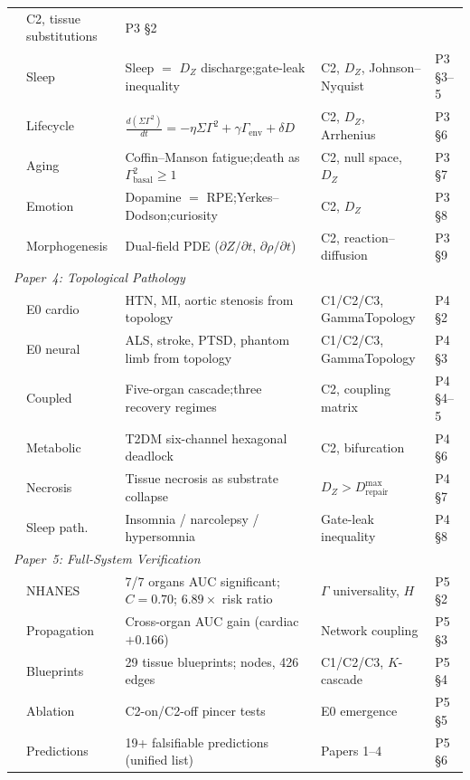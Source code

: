 \documentclass[aps,pre,twocolumn,superscriptaddress,floatfix]{revtex4-2}
\begin{document}
\begin{table}[t]
\begin{ruledtabular}
\begin{tabular}{lllll}
  & C2, tissue substitutions
  & P3 \S2 \\
& Sleep &
  Sleep $=$ $D_Z$ discharge;\;gate-leak inequality
  & C2, $D_Z$, Johnson--Nyquist
  & P3 \S3--5 \\
& Lifecycle &
  $\frac{d(\Sigma\Gamma^2)}{dt}
  = -\eta\Sigma\Gamma^2 + \gamma\Gamma_{\text{env}}
  + \delta D$
  & C2, $D_Z$, Arrhenius
  & P3 \S6 \\
& Aging &
  Coffin--Manson fatigue;\;death as
  $\Gamma^2_{\text{basal}} \ge 1$
  & C2, null space, $D_Z$
  & P3 \S7 \\
& Emotion &
  Dopamine $=$ RPE;\;Yerkes--Dodson;\;curiosity
  & C2, $D_Z$
  & P3 \S8 \\
& Morphogenesis &
  Dual-field PDE
  ($\partial Z/\partial t$, $\partial\rho/\partial t$)
  & C2, reaction--diffusion
  & P3 \S9 \\
\hline
\multicolumn{5}{l}{\textit{Paper~4: Topological
Pathology}} \\
& E0 cardio &
  HTN, MI, aortic stenosis from topology
  & C1/C2/C3, GammaTopology
  & P4 \S2 \\
& E0 neural &
  ALS, stroke, PTSD, phantom limb from topology
  & C1/C2/C3, GammaTopology
  & P4 \S3 \\
& Coupled &
  Five-organ cascade;\;three recovery regimes
  & C2, coupling matrix
  & P4 \S4--5 \\
& Metabolic &
  T2DM six-channel hexagonal deadlock
  & C2, bifurcation
  & P4 \S6 \\
& Necrosis &
  Tissue necrosis as substrate collapse
  & $D_Z > D_{\text{repair}}^{\max}$
  & P4 \S7 \\
& Sleep path. &
  Insomnia / narcolepsy / hypersomnia
  & Gate-leak inequality
  & P4 \S8 \\
\hline
\multicolumn{5}{l}{\textit{Paper~5: Full-System
Verification}} \\
& NHANES &
  7/7 organs AUC significant;\;$C = 0.70$;\;
  $6.89\times$ risk ratio
  & $\Gamma$ universality, $H$
  & P5 \S2 \\
& Propagation &
  Cross-organ AUC gain (cardiac $+0.166$)
  & Network coupling
  & P5 \S3 \\
& Blueprints &
  29 tissue blueprints;\;278 nodes, 426 edges
  & C1/C2/C3, $K$-cascade
  & P5 \S4 \\
& Ablation &
  C2-on/C2-off pincer tests
  & E0 emergence
  & P5 \S5 \\
& Predictions &
  19+ falsifiable predictions (unified list)
  & Papers 1--4
  & P5 \S6 \\
\end{tabular}
\end{ruledtabular}
\end{table}
\end{document}
